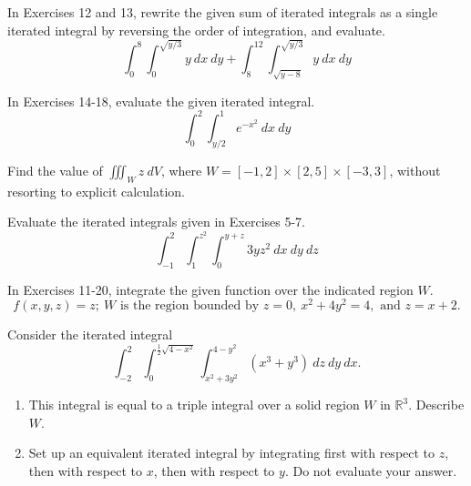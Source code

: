 \documentclass[12pt,letterpaper]{hmcpset}
\newcommand{\RR}{\mathbb{R}}
\begin{document}
\begin{problem}[Colley 5.3.13]
    In Exercises 12 and 13, rewrite the given sum of iterated
    integrals as a single iterated integral by reversing the order of
    integration, and evaluate.
    \[
        \int_0^8\int_0^{\sqrt{y/3}}y\ dx\ dy+
        \int_8^{12}\int_{\sqrt{y-8}}^{\sqrt{y/3}}y\ dx\ dy
    \]
\end{problem}
\begin{solution}
    \vfill
\end{solution}
\newpage

\begin{problem}[Colley 5.3.18]
    In Exercises 14-18, evaluate the given iterated integral.
    \[
        \int_0^2\int_{y/2}^1e^{-x^2}\ dx\ dy
    \]
\end{problem}
\begin{solution}
    \vfill
\end{solution}
\newpage

\begin{problem}[Colley 5.4.4]
    Find the value of $\iiint_Wz\ dV$, where
    $W=[-1,2]\times[2,5]\times[-3,3]$, without resorting to explicit
    calculation.
\end{problem}
\begin{solution}
    \vfill
\end{solution}
\newpage

\begin{problem}[Colley 5.4.5]
    Evaluate the iterated integrals given in Exercises 5-7.
    \[
        \int_{-1}^2\int_1^{z^2}\int_0^{y+z}3yz^2\ dx\ dy\ dz
    \]
\end{problem}
\begin{solution}
    \vfill
\end{solution}
\newpage

\begin{problem}[Colley 5.4.18]
    In Exercises 11-20, integrate the given function over the
    indicated region $W$.
    \[
        f(x,y,z)=z;\ W\text{ is the region bounded by }z=0,
        \ x^2+4y^2=4,\text{ and }z=x+2.
    \]
\end{problem}
\begin{solution}
    \vfill
\end{solution}
\newpage

\begin{problem}[Colley 5.4.29ab]
    Consider the iterated integral
    \[
        \int_{-2}^2\int_0^{\frac{1}{2}\sqrt{4-x^2}}\int_{x^2+3y^2}^{4-y^2}
        (x^3+y^3)\ dz\ dy\ dx.
    \]
    \begin{enumerate}
        \item This integral is equal to a triple integral over a solid
            region $W$ in $\RR^3$. Describe $W$.
        \item Set up an equivalent iterated integral by integrating
            first with respect to $z$, then with respect to $x$, then
            with respect to $y$. Do not evaluate your answer.
    \end{enumerate}
\end{problem}
\begin{solution}
    \vfill
\end{solution}
\end{document}
